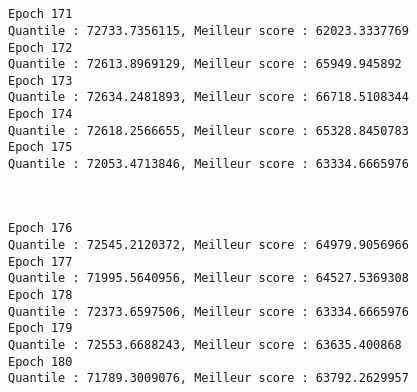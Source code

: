 \documentclass[11pt]{article}
\begin{document}
    \begin{center}
    \end{center}
    { \hspace*{\fill} \\}
    
    \begin{center}
    \end{center}
    { \hspace*{\fill} \\}
    
    \begin{Verbatim}[commandchars=\\\{\}]
Epoch 171
Quantile : 72733.7356115, Meilleur score : 62023.3337769
Epoch 172
Quantile : 72613.8969129, Meilleur score : 65949.945892
Epoch 173
Quantile : 72634.2481893, Meilleur score : 66718.5108344
Epoch 174
Quantile : 72618.2566655, Meilleur score : 65328.8450783
Epoch 175
Quantile : 72053.4713846, Meilleur score : 63334.6665976

    \end{Verbatim}

    \begin{center}
    \end{center}
    { \hspace*{\fill} \\}
    
    \begin{Verbatim}[commandchars=\\\{\}]
Epoch 176
Quantile : 72545.2120372, Meilleur score : 64979.9056966
Epoch 177
Quantile : 71995.5640956, Meilleur score : 64527.5369308
Epoch 178
Quantile : 72373.6597506, Meilleur score : 63334.6665976
Epoch 179
Quantile : 72553.6688243, Meilleur score : 63635.400868
Epoch 180
Quantile : 71789.3009076, Meilleur score : 63792.2629957

    \end{Verbatim}

    \begin{center}
    \end{center}
    { \hspace*{\fill} \\}
    
    \begin{center}
    \end{center}
    { \hspace*{\fill} \\}
    
\end{document}
